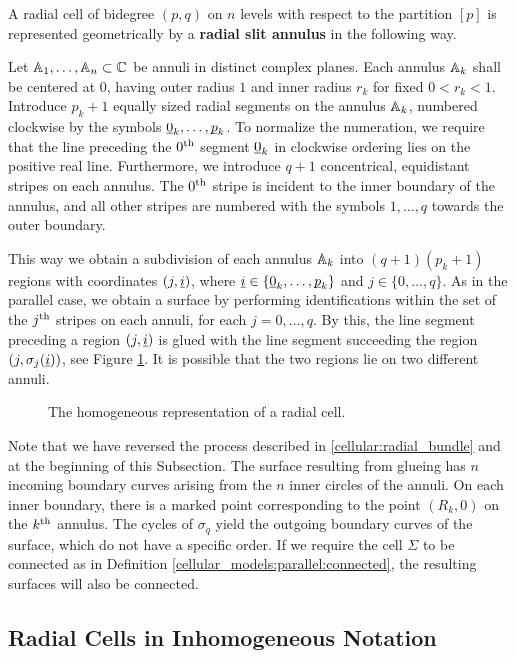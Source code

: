A radial cell of bidegree $(p, q)$ on $n$ levels with respect to the partition $[p]$ is represented geometrically by a \textbf{radial slit annulus} in the following way.

Let $\mathbb A_1, \dotsc, \mathbb A_n \subset \mathbb C$ be annuli in distinct complex planes.
Each annulus $\mathbb A_k$ shall be centered at $0$, having outer radius $1$ and inner radius $r_k$ for fixed $0 < r_k < 1$.
Introduce $p_k+1$ equally sized radial segments on the annulus $\mathbb A_k$, numbered clockwise by the symbols $\underline{\smash{0}}_k, \dotsc, \underline{\smash{p}}_k$.
To normalize the numeration, we require that the line preceding the $0^{\text{th}}$ segment $\underline{\smash{0}}_k$ in clockwise ordering lies on the positive real line.
Furthermore, we introduce $q+1$ concentrical, equidistant stripes on each annulus. 
The $0^{\text{th}}$ stripe is incident to the inner boundary of the annulus,
and all other stripes are numbered with the symbols $1, \dotsc, q$ towards the outer boundary.

This way we obtain a subdivision of each annulus $\mathbb A_k$ into $(q+1)(p_k+1)$ regions with coordinates $(j, \underline{\smash{i}})$, 
where $\underline{\smash{i}} \in \{\underline{\smash{0}}_k, \dotsc, \underline{\smash{p}}_k\}$ and $j \in \{0, \dotsc, q\}$.
As in the parallel case, we obtain a surface by performing identifications within the set of the $j^{\text{th}}$ stripes on each annuli, for each $j = 0, \dotsc, q$.
By this, the line segment preceding a region $(j, \underline{\smash{i}})$ is glued with the line segment succeeding the region $(j, \sigma_j(\underline{\smash{i}}))$,
see Figure \ref{radial:slit_annuli:homogeneous_cell}.
It is possible that the two regions lie on two different annuli.

\begin{figure}[ht]
\centering
{}
\caption{\label{radial:slit_annuli:homogeneous_cell} The homogeneous representation of a radial cell.}
\end{figure}

Note that we have reversed the process described in \ref{cellular:radial_bundle} and at the beginning of this Subsection.
The surface resulting from glueing has $n$ incoming boundary curves arising from the $n$ inner circles of the annuli. 
On each inner boundary, there is a marked point corresponding to the point $(R_k, 0)$ on the $k^{\text{th}}$ annulus.
The cycles of $\sigma_q$ yield the outgoing boundary curves of the surface, which do not have a specific order.
If we require the cell $\Sigma$ to be connected as in Definition \ref{cellular_models:parallel:connected}, the resulting surfaces will also be connected.

\subsection{Radial Cells in Inhomogeneous Notation}
\label{cellular_models:radial:cells_in_inhomogenous_notation}

